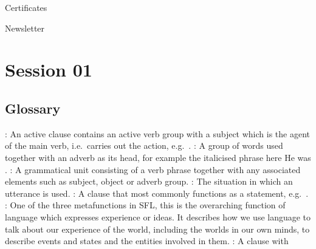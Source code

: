 \documentclass[letterpaper,10pt,english]{sphinxmanual}
\begin{document}
Certificates \textendash{} 

Newsletter ­\textendash{} 


\section{Session 01}
\label{\detokenize{index:session-01}}

\subsection{Glossary}
\label{\detokenize{content/session_01/Part_01_glossary:Glossary}}\label{\detokenize{content/session_01/Part_01_glossary::doc}}
: An active clause contains an active verb group with a subject which is the agent of the main verb, i.e. carries out the action, e.g. . : A group of words used together with an adverb as its head, for example the italicised phrase here He was . : A grammatical unit consisting of a verb phrase together with any associated elements such as subject, object or adverb group. : The situation in which an
utterance is used. : A clause that most commonly functions as a statement, e.g. . : One of the three metafunctions in SFL, this is the overarching function of language which expresses experience or ideas. It describes how we use language to talk about our experience of the world, including the worlds in our own minds, to describe events and states and the entities involved in them. : A clause with
\end{document}
